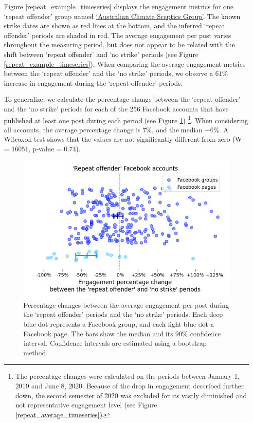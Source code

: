 \documentclass[11pt,a4paper]{article}
\begin{document}
Figure \ref{repeat_example_timeseries} displays the engagement metrics for one `repeat offender' group named \href{https://www.facebook.com/groups/108655705888371/}{`Australian Climate Sceptics Group'}. 
The known strike dates are shown as red lines at the bottom, and the inferred ‘repeat offender’ periods are shaded in red. 
The average engagement per post varies throughout the measuring period, but does not appear to be related with the shift between `repeat offender' and `no strike' periods (see Figure \ref{repeat_example_timeseries}).
When comparing the average engagement metrics between the `repeat offender' and the `no strike' periods, we observe a $61\%$ increase in engagement during the `repeat offender' periods.

To generalize, we calculate the percentage change between the `repeat offender' and the `no strike' periods for each of the 256 Facebook accounts that have published at least one post during each period (see Figure \ref{repeat_vs_free_percentage_change})
\footnote{The percentage changes were calculated on the periods between January 1, 2019 and June 8, 2020. Because of the drop in engagement described further down, the second semester of 2020 was excluded for its vastly diminished and not representative engagement level (see Figure \ref{repeat_average_timeseries}).}.
When considering all accounts, the average percentage change is $7\%$, and the median $-6\%$. 
A Wilcoxon test shows that the values are not significantly different from zero (W = $16051$, p-value = $0.74$).

\begin{figure}[!h]
\centering
\includegraphics[width=\linewidth]{./../figure/repeat_vs_free_percentage_change.png}
\caption{Percentage changes between the average engagement per post during the `repeat offender' periods and the `no strike' periods. 
Each deep blue dot represents a Facebook group, and each light blue dot a Facebook page.
The bars show the median and its $90\%$ confidence interval.
Confidence intervals are estimated using a bootstrap method.}
\label{repeat_vs_free_percentage_change}
\end{figure}
\end{document}
